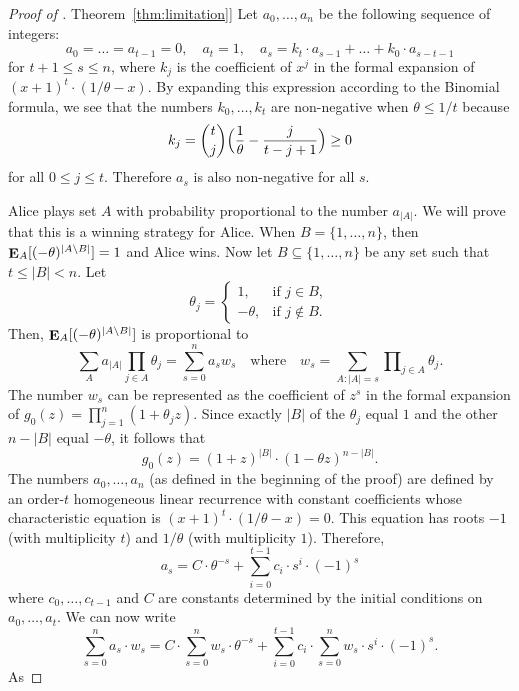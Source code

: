 \documentclass[11pt]{article}
\numberwithin{equation}{section}
\theoremstyle{definition}
\theoremstyle{plain}
\newcommand{\expref}[2]{\hyperref[#2]{#1~\ref{#2}}}
\DeclareMathOperator\E{\mathop{\bf E}}
\providecommand\abs[1]{\lvert#1\rvert}
\begin{document}
\begin{proof}[Proof of \expref{Theorem}{thm:limitation}]
Let $a_0, \dots, a_n$ be the following sequence of integers:
\[ a_0=\dots=a_{t-1}=0, \quad a_t=1, \quad a_s = k_t \cdot a_{s-1} + \dots + k_0 \cdot a_{s-t-1} \]   
for $t+1\leq s\leq n$, where $k_j$ is the coefficient of $x^j$ in the formal expansion of $(x+1)^t\cdot
(1/\theta - x)$.
By expanding this expression according to the Binomial formula, we see
that the numbers $k_0, \dots, k_t$ are non-negative when $\theta \leq 1/t$ because
\[ k_j = \binom{t}{j}\Bigl(\frac{1}{\theta} - \frac{j}{t-j+1}\Bigr) \geq 0 \]
for all $0\leq j\leq t$.  Therefore $a_s$ is also non-negative for all $s$.
	
Alice plays set $A$ with probability proportional to the number $a_{\abs{A}}$.  We will prove that this is a winning strategy for Alice.  When $B = \{1, \dots, n\}$, then $\E_A[(-\theta)^{\abs{A \setminus B}}] = 1$ and Alice wins.  Now let $B\subseteq \{1, \dots, n\}$ be any set such that $t \leq \abs{B} < n$. Let
	\[ \theta_j = \begin{cases}1, &\text{if $j \in B$}, \\ -\theta, &\text{if $j \not\in B$}.\end{cases} \]
	Then, $\E_A[(-\theta)^{\abs{A \setminus B}}]$ is proportional to 
	\[  \sum_A a_{\abs{A}} \prod_{j \in A} \theta_j = \sum_{s = 0}^n a_s w_s \quad\text{where}\quad w_s = \sum_{A\colon \abs{A} = s} \prod\nolimits_{j \in A} \theta_j. \]
The number $w_s$ can be represented as the coefficient of $z^s$ in the formal expansion of $g_0(z) = \prod_{j=1}^n (1 + \theta_j z)$.  Since exactly
$\abs{B}$ of the $\theta_j$  
equal $1$ and the other $n - \abs{B}$ equal $-\theta$, it follows that
	\begin{equation} \label{eq:g_t_closed_form} g_0(z)=(1+z)^{\abs{B}}
	\cdot(1 - \theta z)^{n-\abs{B}}.
	\end{equation}
	The numbers $a_0,\dots,a_n$ (as defined in the beginning of the proof) are defined by an order-$t$ homogeneous linear
%
recurrence %
with constant coefficients whose characteristic equation is
$(x + 1)^t \cdot (1/\theta - x) = 0$. 
This equation has roots $-1$ (with multiplicity $t$) and $1/\theta$ 
(with multiplicity $1$). Therefore,
\[ a_s = C \cdot \theta^{-s} + \sum_{i=0}^{t-1} c_i \cdot s^i \cdot (-1)^s \]
where $c_0, \dots, c_{t-1}$ and $C$ are constants determined by the initial conditions on $a_0, \dots, a_t$.  We can now write
\[ \sum_{s=0}^n a_s \cdot w_s = C \cdot \sum_{s=0}^n w_s \cdot \theta^{-s} +
\sum_{i=0}^{t-1} c_i \cdot \sum_{s=0}^n w_s \cdot s^i \cdot (-1)^s. \] As

\end{proof}
\end{document}
